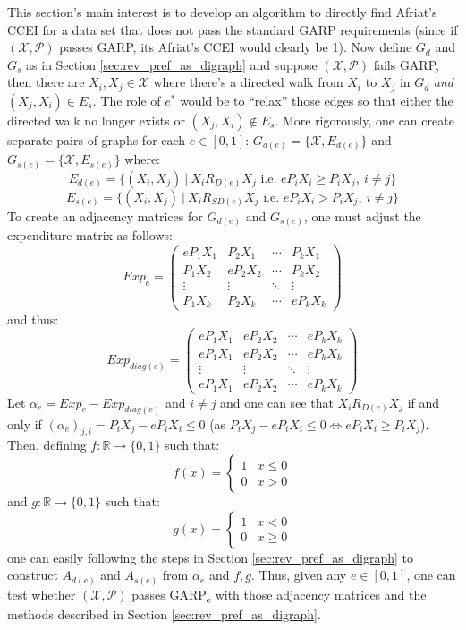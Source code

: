 \documentclass{article} %
\theoremstyle{style1}
\theoremstyle{example}
\begin{document}
This section's main interest is to develop an algorithm to directly find Afriat's CCEI for a data set that does not pass the standard GARP requirements (since if $(\mathcal{X},\mathcal{P})$ passes GARP, its Afriat's CCEI would clearly be 1). Now define $G_d$ and $G_s$ as in Section \ref{sec:rev_pref_as_digraph} and suppose $(\mathcal{X},\mathcal{P})$ fails GARP, then there are $X_i,X_j\in\mathcal{X}$ where there's a directed walk from $X_i$ to $X_j$ in $G_d$ \emph{and} $(X_j,X_i)\in E_s$. The role of $e^*$ would be to ``relax'' those edges so that either the directed walk no longer exists or $(X_j,X_i)\not\in E_s$. More rigorously, one can create separate pairs of graphs for each $e\in[0,1]$: $G_{d(e)}=\{\mathcal{X},E_{d(e)}\}$ and $G_{s(e)}=\{\mathcal{X},E_{s(e)}\}$ where:
$$E_{d(e)}=\{(X_i,X_j)\ |\ X_iR_{D(e)}X_j\textrm{ i.e. } eP_iX_i\geq P_iX_j,\ i\not=j\}$$
$$E_{s(e)}=\{(X_i,X_j)\ |\ X_iR_{SD(e)}X_j\textrm{ i.e. } eP_iX_i> P_iX_j,\ i\not=j\}$$
To create an adjacency matrices for $G_{d(e)}$ and $G_{s(e)}$, one must adjust the expenditure matrix as follows:
\[
Exp_e=
\begin{pmatrix}
eP_1X_1 & P_2X_1 & \cdots & P_kX_1\\
P_1X_2 & eP_2X_2 & \cdots & P_kX_2\\
\vdots & \vdots & \ddots & \vdots \\
P_1X_k & P_2X_k & \cdots & eP_kX_k 
\end{pmatrix}
\]
and thus:
\[
Exp_{diag(e)}=
\begin{pmatrix}
eP_1X_1 & eP_2X_2 & \cdots & eP_kX_k \\
eP_1X_1 & eP_2X_2 & \cdots & eP_kX_k \\
\vdots & \vdots & \ddots & \vdots \\
eP_1X_1 & eP_2X_2 & \cdots & eP_kX_k 
\end{pmatrix}
\]
Let $\alpha_e=Exp_e-Exp_{diag(e)}$ and $i\not=j$ and one can see that $X_i R_{D(e)} X_j$ if and only if $(\alpha_e)_{j,i}=P_iX_j-eP_iX_i\leq0$ (as $P_iX_j-eP_iX_i\leq0 \iff eP_iX_i\geq P_iX_j$). Then, defining $f:\mathbb{R}\to\{0,1\}$ such that:
\[f(x)=\begin{cases}
1 & x\leq 0\\
0 & x>0
\end{cases}
\]
and $g:\mathbb{R}\to\{0,1\}$ such that:
\[g(x)=\begin{cases}
1 & x<0\\
0 & x\geq0
\end{cases}
\]
one can easily following the steps in Section \ref{sec:rev_pref_as_digraph} to construct $A_{d(e)}$ and $A_{s(e)}$ from $\alpha_e$ and $f, g$. Thus, given any $e\in[0,1]$, one can test whether $(\mathcal{X},\mathcal{P})$ passes GARP\textsubscript{e} with those adjacency matrices and the methods described in Section \ref{sec:rev_pref_as_digraph}.
\end{document}
